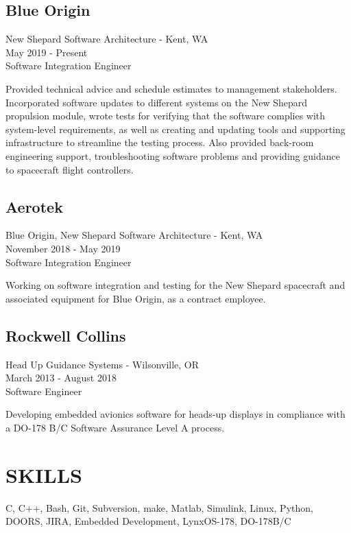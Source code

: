 \documentclass{article}
\newcommand{\skills}{C, C++,  Bash, Git, Subversion, make, Matlab, Simulink, Linux, Python, DOORS, JIRA, Embedded Development, LynxOS-178, DO-178B/C}
\newenvironment{job_desc}
    {
        \newline
        \begin{small}
    }
    {
        \end{small}
        \newline
    }
\begin{document}
    \begin{minipage}[t]{1\textwidth}

        \subsection*{Blue Origin}
            New Shepard Software Architecture - Kent, WA \\
            May 2019 - Present \\
            Software Integration Engineer\\
            \begin{job_desc}
            Provided technical advice and schedule estimates to management stakeholders.
            Incorporated software updates to different systems on the New Shepard propulsion module, wrote tests for
            verifying that the software complies with system-level requirements, as well as creating and updating tools and supporting
            infrastructure to streamline the testing process. Also provided back-room engineering support, troubleshooting software
            problems and providing guidance to spacecraft flight controllers.
            \end{job_desc}

        \subsection*{Aerotek}
            Blue Origin, New Shepard Software Architecture - Kent, WA \\
            November 2018 - May 2019 \\
            Software Integration Engineer\\
            \begin{job_desc}
                Working on software integration and testing for the New Shepard spacecraft and associated equipment for Blue Origin, as a contract employee.
            \end{job_desc}

        \subsection*{Rockwell Collins}
            Head Up Guidance Systems - Wilsonville, OR \\
            March 2013 - August 2018 \\
            Software Engineer\\
            \begin{job_desc}
            Developing embedded avionics software for heads-up displays in compliance with a DO-178 B/C Software Assurance Level A process.
            \end{job_desc}

    \end{minipage}


\section*{SKILLS}
        \skills
\end{document}
